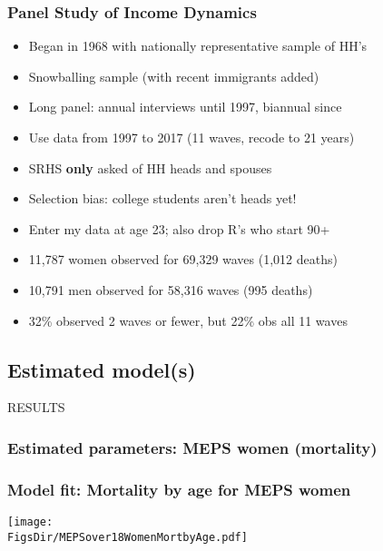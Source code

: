 \documentclass[aspectratio=169]{beamer}
\newcommand{\FigsDir}{../Figures}
\newcommand{\TabsDir}{../Tables}
\begin{document}
\begin{frame}\frametitle{Panel Study of Income Dynamics}
\begin{itemize}
\item <1->Began in 1968 with nationally representative sample of HH's

\item <1->Snowballing sample (with recent immigrants added)

\item <1->Long panel: annual interviews until 1997, biannual since

\item <2->Use data from 1997 to 2017 (11 waves, recode to 21 years)

\item <2->SRHS \textbf{only} asked of HH heads and spouses

\item <2->Selection bias: college students aren't heads yet!

\item <2->Enter my data at age 23; also drop R's who start 90+

\item <3->11,787 women observed for 69,329 waves (1,012 deaths)

\item <3->10,791 men observed for 58,316 waves (995 deaths)

\item <3->32\% observed 2 waves or fewer, but 22\% obs all 11 waves

\end{itemize}
\end{frame}


\subsection{Estimated model(s)}


\begin{frame}
\begin{center}
	\Huge
	RESULTS
\end{center}
\end{frame}


\begin{frame}\frametitle{Estimated parameters: MEPS women (mortality)}

\end{frame}


\begin{frame}\frametitle{Model fit: Mortality by age for MEPS women}
\begin{center}
	\texttt{[image: \\FigsDir/MEPSover18WomenMortbyAge.pdf]}
\end{center}
\end{frame}
\end{document}
